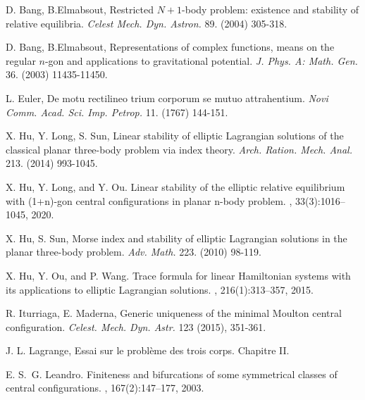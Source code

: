 \documentclass[11pt]{article}
\begin{document}
\begin{thebibliography}{}

 D. Bang, B.Elmabsout, Restricted $N+1$-body problem: existence
and stability of relative equilibria.
{\it Celest Mech. Dyn. Astron.}  89. (2004) 305-318.

 D. Bang, B.Elmabsout, Representations of complex functions, means on the regular $n$-gon
and applications to gravitational potential.
{\it J. Phys. A: Math. Gen.}  36. (2003) 11435-11450.

 L. Euler, De motu rectilineo trium corporum se mutuo
attrahentium. {\it Novi Comm. Acad. Sci. Imp. Petrop.}  11. (1767) 144-151.


 X. Hu, Y. Long, S. Sun, Linear stability of elliptic Lagrangian
solutions of the classical planar three-body problem via index theory.
{\it Arch. Ration. Mech. Anal.} 213. (2014) 993-1045.

X. Hu, Y. Long, and Y. Ou.
\newblock Linear stability of the elliptic relative equilibrium with (1+n)-gon
central configurations in planar n-body problem.
, 33(3):1016--1045, {2020}.

 X. Hu, S. Sun, Morse index and stability of elliptic Lagrangian
solutions in the planar three-body problem. {\it Adv. Math.} 223. (2010) 98-119.


X. Hu, Y. Ou, and P. Wang.
\newblock Trace formula for linear {H}amiltonian systems with its applications
to elliptic {L}agrangian solutions.
, 216(1):313--357, 2015.

 R. Iturriaga, E. Maderna, Generic uniqueness of the minimal
Moulton central configuration. {\it Celest. Mech. Dyn. Astr.} 123 (2015), 351-361.


  J. L. Lagrange,  Essai sur le probl\`{e}me des trois corps. Chapitre II.

E. S.~G. Leandro.
\newblock Finiteness and bifurcations of some symmetrical classes of central
configurations.
, 167(2):147--177,
{2003}.


\end{thebibliography}
\end{document}
